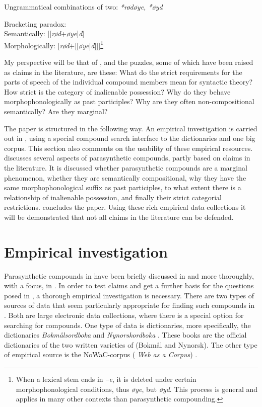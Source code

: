 \documentclass[output=paper]{LSP/langsci}
\begin{document}
\ex
 
  Ungrammatical combinations of two: \textit{*rødøye, *øyd}

\ex
 
  Bracketing paradox:\\
    Semantically: [[\textit{rød}+\textit{øye}]\textit{d}]\\
    Morphologically: [\textit{rød}+[[\textit{øye}]\textit{d}]]]\footnote{When a lexical stem ends in \textit{–e}, it is deleted under certain morphophonological conditions, thus \textit{øye}, but \textit{øyd}. This process is general and applies in many other contexts than parasynthetic compounding.} 
\z
\z

My perspective will be that of , and the puzzles, some of which have been raised as claims in the literature,  are these: What do the strict requirements for the parts of speech of the individual compound members mean for syntactic theory? How strict is the category of inalienable possession? Why do they behave morphophonologically as past participles? Why are they often non-compositional semantically? Are they marginal? 

The paper is structured in the following way. An empirical investigation is carried out in , using a special compound search interface to the dictionaries and one big corpus. This section also comments on the usability of these empirical resources.  discusses several aspects of parasynthetic compounds, partly based on claims in the literature. It is discussed whether parasynthetic compounds are a marginal phenomenon, whether they are semantically compositional, why they have the same morphophonological suffix as past participles, to what extent there is a relationship of inalienable possession, and finally their strict categorial restrictions.  concludes the paper. Using these rich empirical data collections it will be demonstrated that not all claims in the literature can be defended.

\section{Empirical investigation}\label{sec:bondi:2}

Parasynthetic compounds in  have been briefly discussed in \citet{Johannessen2001} and more thoroughly, with a  focus,  in \citet{Grov2009}.  In order to test claims and get a further basis for the questions posed in , a thorough empirical investigation is necessary. There are two types of sources of data that seem particularly appropriate for finding such compounds in . Both are large electronic data collections, where there is a special option for searching for compounds.  One type of data is dictionaries, more specifically, the  dictionaries \textit{Bokmålsordboka} \citep{Wangensteen2005} and \textit{Nynorskordboka} \citep{Hovdenak2001}. These books are the official dictionaries of the two written varieties of  (Bokmål and Nynorsk).  The other type of empirical source is the NoWaC-corpus (\textit{ Web as a Corpus}) \citep{Guevara2010}. 
\end{document}
